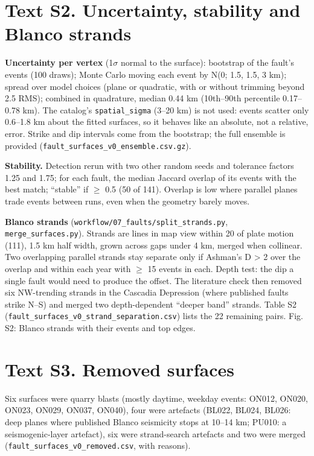 \documentclass[11pt]{article}
\begin{document}
\section{Text S2. Uncertainty, stability and Blanco
strands}\label{text-s2.-uncertainty-stability-and-blanco-strands}

\textbf{Uncertainty per vertex} (1\ensuremath{\sigma} normal to the surface): bootstrap of
the fault's events (100 draws); Monte Carlo moving each event by N(0;
1.5, 1.5, 3 km); spread over model choices (plane or quadratic, with or
without trimming beyond 2.5 RMS); combined in quadrature, median 0.44 km
(10th--90th percentile 0.17--0.78 km). The catalog's
\texttt{spatial\_sigma} (3--20 km) is not used: events scatter only
0.6--1.8 km about the fitted surfaces, so it behaves like an absolute,
not a relative, error. Strike and dip intervals come from the bootstrap;
the full ensemble is provided
(\texttt{fault\_surfaces\_v0\_ensemble.csv.gz}).

\textbf{Stability.} Detection rerun with two other random seeds and
tolerance factors 1.25 and 1.75; for each fault, the median Jaccard
overlap of its events with the best match; ``stable'' if \ensuremath{\geq} 0.5 (50 of
141). Overlap is low where parallel planes trade events between runs,
even when the geometry barely moves.

\textbf{Blanco strands} (\texttt{workflow/07\_faults/split\_strands.py},
\texttt{merge\_surfaces.py}). Strands are lines in map view within 20\textdegree{}
of plate motion (111\textdegree{}), 1.5 km half width, grown across gaps under 4 km,
merged when collinear. Two overlapping parallel strands stay separate
only if Ashman's D \textgreater{} 2 \citep{Ashman1994} over the overlap
and within each year with \ensuremath{\geq} 15 events in each. Depth test: the dip a
single fault would need to produce the offset. The literature check then
removed six NW-trending strands in the Cascadia Depression (where
published faults strike N--S) and merged two depth-dependent ``deeper
band'' strands. Table S2
(\texttt{fault\_surfaces\_v0\_strand\_separation.csv}) lists the 22
remaining pairs. Fig. S2: Blanco strands with their events and top
edges.

\section{Text S3. Removed surfaces}\label{text-s3.-removed-surfaces}

Six surfaces were quarry blasts (mostly daytime, weekday events: ON012,
ON020, ON023, ON029, ON037, ON040), four were artefacts (BL022, BL024,
BL026: deep planes where published Blanco seismicity stops at 10--14 km;
PU010: a seismogenic-layer artefact), six were strand-search artefacts
and two were merged (\texttt{fault\_surfaces\_v0\_removed.csv}, with
reasons).
\end{document}
